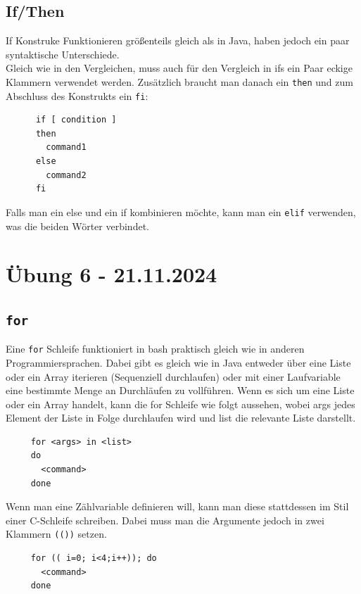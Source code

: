 \documentclass{article}
\begin{document}
	\subsection{If/Then}
	If Konstruke Funktionieren größenteils gleich als in Java, haben jedoch ein paar syntaktische Unterschiede. \\
	Gleich wie in den Vergleichen, muss auch für den Vergleich in ifs ein Paar eckige Klammern verwendet werden. Zusätzlich braucht man danach ein \verb|then| und zum Abschluss des Konstrukts ein \verb|fi|:
	\begin{verbatim}
	  if [ condition ]
	  then
	  	command1
	  else
	  	command2
	  fi
	\end{verbatim} 
	Falls man ein else und ein if kombinieren möchte, kann man ein \verb|elif| verwenden, was die beiden Wörter verbindet.
	\section{Übung 6 - 21.11.2024}
	\cprotect\subsection{\verb|for|}
	Eine \verb|for| Schleife funktioniert in bash praktisch gleich wie in anderen Programmiersprachen. Dabei gibt es gleich wie in Java entweder über eine Liste oder ein Array iterieren (Sequenziell durchlaufen) oder mit einer Laufvariable eine bestimmte Menge an Durchläufen zu vollführen. Wenn es sich um eine Liste oder ein Array handelt, kann die for Schleife wie folgt aussehen, wobei args jedes Element der Liste in Folge durchlaufen wird und list die relevante Liste darstellt.
	\begin{verbatim}
	 for <args> in <list>
	 do
	   <command>
	 done
	 \end{verbatim} 
	 Wenn man eine Zählvariable definieren will, kann man diese stattdessen im Stil einer C-Schleife schreiben. Dabei muss man die Argumente jedoch in zwei Klammern \verb|(())| setzen. 
	 \begin{verbatim}
	 for (( i=0; i<4;i++)); do
	   <command>
	 done
	 \end{verbatim} 
\end{document}
